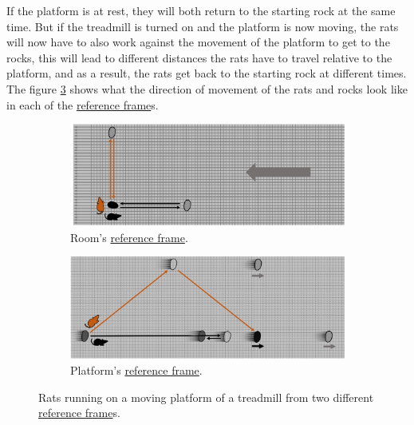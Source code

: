 If the platform is at rest, they will both return to the starting rock at the same time. But if the treadmill is turned on and the platform is now moving, the rats will now have to also work against the movement of the platform to get to the rocks, this will lead to different distances the rats have to travel relative to the platform, and as a result, the rats get back to the starting rock at different times. The figure \ref{fig: treadmill} shows what the direction of movement of the rats and rocks look like in each of the \hyperlink{def-Reference-frame}{reference frame}s.

\begin{figure}[H]
	\centering
	\begin{subfigure}{0.9\textwidth}
		\centering
		\includegraphics[width=\textwidth]{images/pdf/rats_moving.pdf}
		\caption{Room's \protect\hyperlink{def-Reference-frame}{reference frame}.}
		\label{fig: rat with moving platform}
	\end{subfigure}
	\begin{subfigure}{0.9\textwidth}
		\vspace{0.2cm}
		\centering
		\includegraphics[width=\textwidth]{images/pdf/rats_platform_frame.pdf}
		\caption{Platform's \protect\hyperlink{def-Reference-frame}{reference frame}.}
		\label{fig: rat platform reference frame}
	\end{subfigure}
	\caption{Rats running on a moving platform of a treadmill from two different \protect\hyperlink{def-Reference-frame}{reference frame}s.}
	\label{fig: treadmill}
\end{figure}

